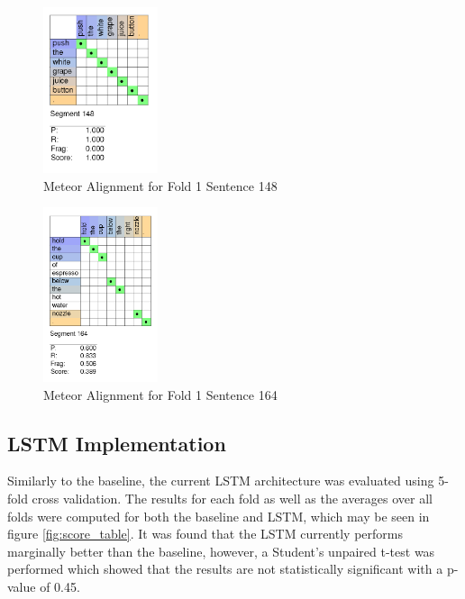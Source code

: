 \documentclass[letterpaper, 12 pt, conference]{ieeeconf}
\begin{document}
\begin{figure}[htb!]
  \centering
  \includegraphics[width=0.3\textwidth]{fold_1_sentence_148}
  \caption{Meteor Alignment for Fold 1 Sentence 148}
  \label{fig:fold_1_sentence_148}
\end{figure}

\begin{figure}[htb!]
  \centering
  \includegraphics[width=0.3\textwidth]{fold_1_sentence_164}
  \caption{Meteor Alignment for Fold 1 Sentence 164}
  \label{fig:fold_1_sentence_164}
\end{figure}

\subsection{LSTM Implementation}

Similarly to the baseline, the current LSTM architecture was evaluated using 5-fold cross validation. The results for each fold as well as the averages over all folds were computed for both the baseline and LSTM, which may be seen in figure \ref{fig:score_table}. It was found that the LSTM currently performs marginally better than the baseline, however, a Student's unpaired t-test was performed which showed that the results are not statistically significant with a p-value of 0.45. 
\end{document}
